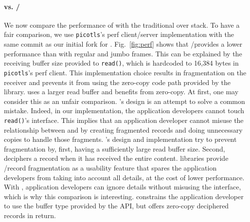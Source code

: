 \paragraph*{\tcpls vs. \tls/\tcp} We now compare the performance of \tcpls with
the traditional \tls over \tcp stack. To have a fair comparison, we use
\texttt{picotls}'s perf client/server implementation with the same commit as our
initial fork for \tcpls. Fig.~\ref{fig:perf} shows that \tls/\tcp provides a
lower performance than \tcpls with regular and jumbo frames. This can be
explained by the receiving buffer size provided to \texttt{read()}, which is
hardcoded to 16,384 bytes in \texttt{picotls}'s perf client. This implementation
choice results in fragmentation on the receiver and prevents it from using the
zero-copy code path provided by the library. \tcpls uses a larger read buffer
and benefits from zero-copy. At first, one may consider this as an unfair
comparison. \tcpls's design is an attempt to solve a common mistake. Indeed, in our \tcpls implementation,
the application developers cannot touch \texttt{read()}'s interface. This
implies that an application developer cannot misuse the relationship between
\tls and \tcp by creating fragmented records and doing unnecessary copies to
handle those fragments. \tcpls's design and implementation try to prevent
fragmentation by, first, having a sufficiently large read buffer size. Second,
\tcpls deciphers a record when it has received the entire content.
\tls libraries provide \tls/\tcp record fragmentation as a usability
feature that spares the application developers from taking into account all \tls
details, at the cost of lower performance. With \tcpls, application developers
can ignore \tls details without misusing the interface, which is why
this comparison is interesting. \tcpls constrains the application developer to
use the buffer type provided by the API, but offers zero-copy deciphered records
in return.


